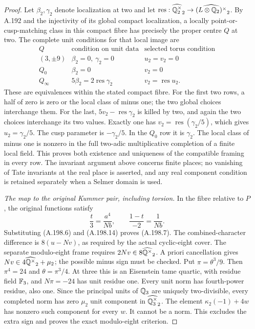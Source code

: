 \begin{proof}
Let \(\beta_2,\gamma_2\) denote localization at two and let
\(\operatorname{res}:\widehat{\mathbb Q_2^\times}_2\to
\widehat{(L\otimes\mathbb Q_2)^\times}_2\).
By A.192 and the injectivity of its global compact localization,
a locally point-or-cusp-matching class in this compact fibre
has precisely the proper centre \(Q\) at two.  The complete
unit conditions for that local image are
\[
\begin{array}{c|c|c}
 Q&\text{condition on unit data}&\text{selected torus condition}\\ \hline
 (3,\pm9)&\beta_2=0,\ \gamma_2=0&u_2=v_2=0\\
 Q_0&\beta_2=0&v_2=0\\
 Q_\infty&5\beta_2=2\operatorname{res}\gamma_2
                                      &v_2=\operatorname{res}u_2.
\end{array}
\tag{A.198.15}
\]
These are equivalences within the stated compact fibre.
For the first two rows, a half of zero is zero or the local
class of minus one; the two global choices interchange them.
For the last, \(5v_2-\operatorname{res}\gamma_2\) is killed
by two, and again the two choices interchange its two values.
Exactly one has \(v_2=\operatorname{res}(\gamma_2/5)\),
which gives \(u_2=\gamma_2/5\).  The cusp parameter is
\(-\gamma_2/5\).  In the \(Q_0\) row it is \(\gamma_2\).
The local class of minus one is nonzero in the full two-adic
multiplicative completion of a finite local field.
This proves both existence and uniqueness of the compatible
framing in every row.  The invariant argument above concerns
finite places; no vanishing of Tate invariants at the real
place is asserted, and any real component condition is retained
separately when a Selmer domain is used.

\emph{The map to the original Kummer pair, including torsion.}
In the fibre relative to \(P\), the original functions satisfy
\[
             \frac t3=\frac{a^4}{Nb},\qquad
             \frac{1-t}{-2}=\frac1{Nb}.
\tag{A.198.16}
\]
Substituting (A.198.6) and (A.198.14) proves (A.198.7).
The combined-character difference is \(8(u-Nv)\), as required
by the actual cyclic-eight cover.
The separate modulo-eight frame requires \(2Nv\in8\widehat{\mathbb Q^\times}_2\).
A priori cancellation gives
\(Nv\in4\widehat{\mathbb Q^\times}_2+\mu_2\); the possible minus
sign must be checked.  Put \(\pi=\theta^3/9\).
Then \(\pi^4=24\) and \(\theta=\pi^3/4\).
At three this is an Eisenstein tame quartic, with residue field
\(\mathbb F_3\), and \(N\pi=-24\) has unit residue one.
Every unit norm has fourth-power residue, also one.
Since the principal units of \(\mathbb Q_3\) are uniquely
two-divisible, every completed norm has zero \(\mu_2\) unit
component in \(\widehat{\mathbb Q_3^\times}_2\).
The element \(\kappa_2(-1)+4w\) has nonzero such component
for every \(w\).  It cannot be a norm.  This excludes the
extra sign and proves the exact modulo-eight criterion.


\end{proof}
